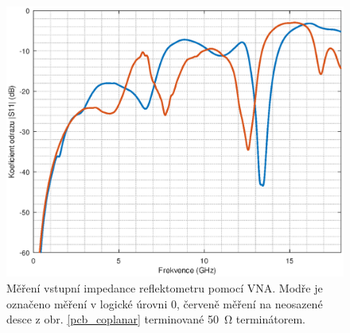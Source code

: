 \begin{figure}[htbp]
\includegraphics[width=\textwidth,keepaspectratio]{images/measurements/vna_low_blank.eps}\caption{Měření vstupní impedance reflektometru pomocí VNA. Modře je označeno měření v logické úrovni 0, červeně měření na neosazené desce z obr. \ref{pcb_coplanar} terminované \SI{50}{\ohm} terminátorem.}\label{vna_impedance_blank}
\end{figure}

